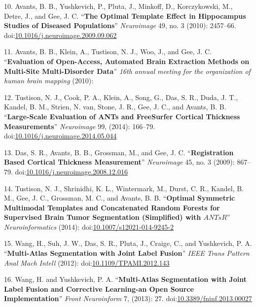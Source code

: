 \documentclass[11pt,]{article}
\begin{document}
10. Avants, B. B., Yushkevich, P., Pluta, J., Minkoff, D., Korczykowski,
M., Detre, J., and Gee, J. C. ``\textbf{The Optimal Template Effect in
Hippocampus Studies of Diseased Populations}'' \emph{Neuroimage} 49, no.
3 (2010): 2457--66.
doi:\href{http://dx.doi.org/10.1016/j.neuroimage.2009.09.062}{10.1016/j.neuroimage.2009.09.062}

11. Avants, B. B., Klein, A., Tustison, N. J., Woo, J., and Gee, J. C.
``\textbf{Evaluation of Open-Access, Automated Brain Extraction Methods
on Multi-Site Multi-Disorder Data}'' \emph{16th annual meeting for the
organization of human brain mapping} (2010):

12. Tustison, N. J., Cook, P. A., Klein, A., Song, G., Das, S. R., Duda,
J. T., Kandel, B. M., Strien, N. van, Stone, J. R., Gee, J. C., and
Avants, B. B. ``\textbf{Large-Scale Evaluation of ANTs and FreeSurfer
Cortical Thickness Measurements}'' \emph{Neuroimage} 99, (2014):
166--79.
doi:\href{http://dx.doi.org/10.1016/j.neuroimage.2014.05.044}{10.1016/j.neuroimage.2014.05.044}

13. Das, S. R., Avants, B. B., Grossman, M., and Gee, J. C.
``\textbf{Registration Based Cortical Thickness Measurement}''
\emph{Neuroimage} 45, no. 3 (2009): 867--79.
doi:\href{http://dx.doi.org/10.1016/j.neuroimage.2008.12.016}{10.1016/j.neuroimage.2008.12.016}

14. Tustison, N. J., Shrinidhi, K. L., Wintermark, M., Durst, C. R.,
Kandel, B. M., Gee, J. C., Grossman, M. C., and Avants, B. B.
``\textbf{Optimal Symmetric Multimodal Templates and Concatenated Random
Forests for Supervised Brain Tumor Segmentation (Simplified) with
$ANTsR$}'' \emph{Neuroinformatics} (2014):
doi:\href{http://dx.doi.org/10.1007/s12021-014-9245-2}{10.1007/s12021-014-9245-2}

15. Wang, H., Suh, J. W., Das, S. R., Pluta, J., Craige, C., and
Yushkevich, P. A. ``\textbf{Multi-Atlas Segmentation with Joint Label
Fusion}'' \emph{IEEE Trans Pattern Anal Mach Intell} (2012):
doi:\href{http://dx.doi.org/10.1109/TPAMI.2012.143}{10.1109/TPAMI.2012.143}

16. Wang, H. and Yushkevich, P. A. ``\textbf{Multi-Atlas Segmentation
with Joint Label Fusion and Corrective Learning-an Open Source
Implementation}'' \emph{Front Neuroinform} 7, (2013): 27.
doi:\href{http://dx.doi.org/10.3389/fninf.2013.00027}{10.3389/fninf.2013.00027}
\end{document}
